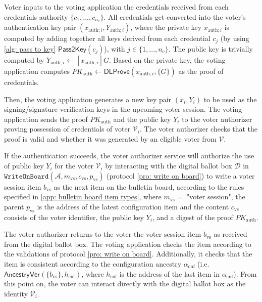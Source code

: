 Voter inputs to the voting application the credentials received from each credentials authority $\{ c_1, ..., c_{n_\mathrm{c}} \}$. All credentials get converted into the voter's authentication key pair $(x_{\mathrm{auth}; i}, Y_{\mathrm{auth}; i})$, where the private key $x_{\mathrm{auth}; i}$ is computed by adding together all keys derived from each credential $c_j$ (by using \cref{alg: pass to key} $\mathsf{Pass2Key}(c_j)$), with $j \in \{ 1, ..., n_\mathrm{c} \}$. The public key is trivially computed by $Y_{\mathrm{auth}; i} \gets [x_{\mathrm{auth}; i}]G$. Based on the private key, the voting application computes $PK_\mathrm{auth} \gets \mathsf{DLProve} (x_{\mathrm{auth}; i}, \{ G \})$ as the proof of credentials.

Then, the voting application generates a new key pair $(x_i, Y_i)$ to be used as the signing/signature verification keys in the upcoming voter session. The voting application sends the proof $PK_\mathrm{auth}$ and the public key $Y_i$ to the voter authorizer proving possession of credentials of voter $\mathcal{V}_i$. The voter authorizer checks that the proof is valid and whether it was generated by an eligible voter from $\boldsymbol{\mathcal{V}}$.

If the authentication succeeds, the voter authorizer service will authorize the use of public key $Y_i$ for the voter $\mathcal{V}_i$ by interacting with the digital ballot box $\mathcal{D}$ in $\mathtt{WriteOnBoard}(\mathcal{A}, m_\mathrm{vs}, c_\mathrm{vs}, p_\mathrm{vs})$ (protocol \ref{pro: write on board}) to write a voter session item $b_\mathrm{vs}$ as the next item on the bulletin board, according to the rules specified in \cref{app: bulletin board item types}, where $m_\mathrm{vs} =$ "voter session", the parent $p_\mathrm{vs}$ is the address of the latest configuration item and the content $c_\mathrm{vs}$ consists of the voter identifier, the public key $Y_i$, and a digest of the proof $PK_\mathrm{auth}$.

The voter authorizer returns to the voter the voter session item $b_\mathrm{vs}$ as received from the digital ballot box. The voting application checks the item according to the validations of protocol \ref{pro: write on board}. Additionally, it checks that the item is consistent according to the configuration ancestry $\alpha_\mathrm{cnf}$ (i.e. $\mathsf{AncestryVer}(\{ b_\mathrm{vs} \}, h_\mathrm{cnf})$, where $h_\mathrm{cnf}$ is the address of the last item in $\alpha_\mathrm{cnf}$). From this point on, the voter can interact directly with the digital ballot box as the identity $\mathcal{V}_i$.

